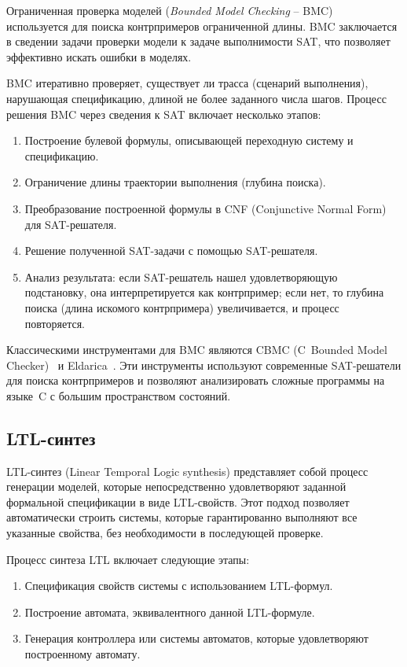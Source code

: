 Ограниченная проверка моделей (\textit{Bounded Model Checking} \--- BMC)~\cite{biere1999a} используется для поиска контрпримеров ограниченной длины.
BMC заключается в сведении задачи проверки модели к задаче выполнимости SAT, что позволяет эффективно искать ошибки в моделях.

BMC итеративно проверяет, существует ли трасса (сценарий выполнения), нарушающая спецификацию, длиной не более заданного числа шагов.
Процесс решения BMC через сведения к SAT включает несколько этапов:
\begin{enumerate}
    \item Построение булевой формулы, описывающей переходную систему и спецификацию.
    \item Ограничение длины траектории выполнения (глубина поиска).
    \item Преобразование построенной формулы в CNF (Conjunctive Normal Form) для SAT-решателя.
    \item Решение полученной SAT-задачи с помощью SAT-решателя.
    \item Анализ результата: если SAT-решатель нашел удовлетворяющую подстановку, она интерпретируется как контрпример; если нет, то глубина поиска (длина искомого контрпримера) увеличивается, и процесс повторяется.
\end{enumerate}

Классическими инструментами для BMC являются CBMC (C~Bounded Model Checker)~\cite{kroening2014} и Eldarica~\cite{hojjat2018}.
Эти инструменты используют современные SAT-решатели для поиска контрпримеров и позволяют анализировать сложные программы на языке~C с большим пространством состояний.


\subsection{LTL-синтез}

LTL-синтез (Linear Temporal Logic synthesis) представляет собой процесс генерации моделей, которые непосредственно удовлетворяют заданной формальной спецификации в виде LTL-свойств.
Этот подход позволяет автоматически строить системы, которые гарантированно выполняют все указанные свойства, без необходимости в последующей проверке.

Процесс синтеза LTL включает следующие этапы:
\begin{enumerate}
    \item Спецификация свойств системы с использованием LTL-формул.
    \item Построение автомата, эквивалентного данной LTL-формуле.
    \item Генерация контроллера или системы автоматов, которые удовлетворяют построенному автомату.
\end{enumerate}

